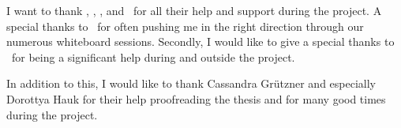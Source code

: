 \vskip 1cm
I want to thank \FIRSTADVISOR, \SECONDMEMBER, \CHAIRPERSON, and \THIRDMEMBER\ for all their help and support during the project.
A special thanks to \SECONDMEMBER\ for often pushing me in the right direction through our numerous whiteboard sessions.
Secondly, I would like to give a special thanks to \FIRSTADVISOR\  for being a significant help during and outside the project.

In addition to this, I would like to thank Cassandra Gr\"utzner and especially 
Dorottya Hauk for their help proofreading the thesis 
and for many good times during the project.

\vskip 2cm
\noindent \AUTHOR \\
\PLACE \\
\DATE
